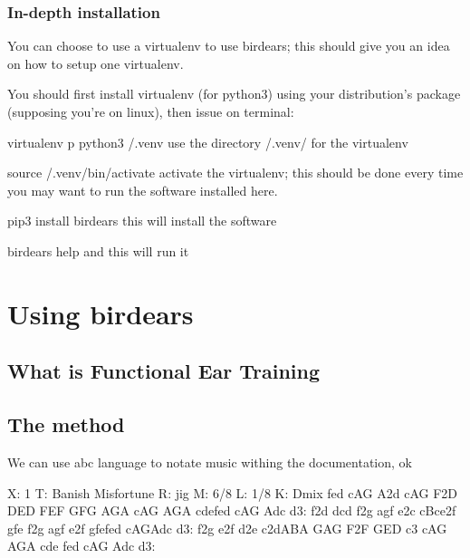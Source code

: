 \documentclass[letterpaper,10pt,english]{sphinxmanual}
\begin{document}
\subsection{In-depth installation}
\label{\detokenize{index:in-depth-installation}}
You can choose to use a virtualenv to use birdears; this should give you
an idea on how to setup one virtualenv.

You should first install virtualenv (for python3) using your
distribution’s package (supposing you’re on linux), then issue on terminal:

%
\begin{sphinxVerbatim}[commandchars=\\\{\}]
virtualenv \PYGZhy{}p python3 \PYGZti{}/.venv \PYGZsh{} use the directory \PYGZti{}/.venv/ for the virtualenv

source \PYGZti{}/.venv/bin/activate   \PYGZsh{} activate the virtualenv; this should be done
                              \PYGZsh{} every time you may want to run the software
                              \PYGZsh{} installed here.

pip3 install birdears         \PYGZsh{} this will install the software

birdears \PYGZhy{}\PYGZhy{}help               \PYGZsh{} and this will run it
\end{sphinxVerbatim}


\chapter{Using birdears}
\label{\detokenize{index:using-birdears}}

\section{What is Functional Ear Training}
\label{\detokenize{index:what-is-functional-ear-training}}


\section{The method}
\label{\detokenize{index:the-method}}
We can use abc language to notate music withing the documentation, ok

%
\begin{sphinxVerbatim}[commandchars=\\\{\}]
X: 1
T: Banish Misfortune
R: jig
M: 6/8
L: 1/8
K: Dmix
fed cAG\textbar{} A2d cAG\textbar{} F2D DED\textbar{} FEF GFG\textbar{}
AGA cAG\textbar{} AGA cde\textbar{}fed cAG\textbar{} Ad\PYGZca{}c d3:\textbar{}
f2d d\PYGZca{}cd\textbar{} f2g agf\textbar{} e2c cBc\textbar{}e2f gfe\textbar{}
f2g agf\textbar{} e2f gfe\textbar{}fed cAG\textbar{}Ad\PYGZca{}c d3:\textbar{}
f2g e2f\textbar{} d2e c2d\textbar{}ABA GAG\textbar{} F2F GED\textbar{}
c3 cAG\textbar{} AGA cde\textbar{} fed cAG\textbar{} Ad\PYGZca{}c d3:\textbar{}
\end{sphinxVerbatim}
\end{document}
